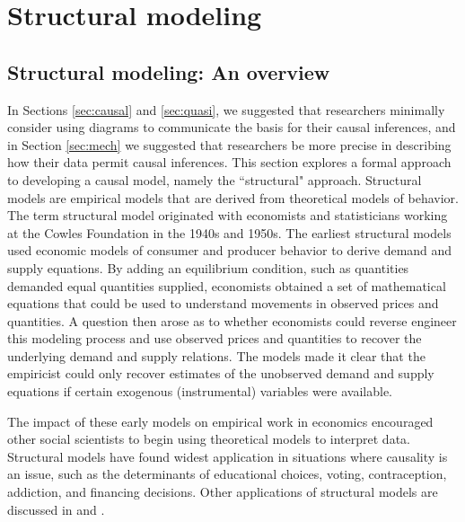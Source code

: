 \section{Structural modeling} \label{sec:struct}

\subsection{Structural modeling: An overview}

In Sections \ref{sec:causal} and \ref{sec:quasi}, we suggested that researchers minimally consider using diagrams to communicate the basis for their causal inferences, and in Section \ref{sec:mech} we suggested that researchers be more precise in describing how their data permit causal
inferences.
This section explores a formal approach to developing a causal model, 
namely the ``structural" approach.
Structural models are empirical models that are derived from theoretical models of behavior.
The term structural model originated with economists and statisticians working at the Cowles Foundation in the 1940s and 1950s.
The earliest structural models used economic models of consumer and producer behavior to derive demand and supply equations.
By adding an equilibrium condition, such as quantities demanded equal quantities supplied, economists obtained a set of mathematical equations that could be used to understand movements in observed prices and quantities. A question then arose as to whether economists could reverse engineer this modeling process and use observed prices and quantities to recover the underlying demand and supply relations.
The models made it clear that the empiricist could only recover estimates of the unobserved demand and supply equations if certain exogenous (instrumental) variables were available. 

The impact of these early models on empirical work in economics encouraged other social scientists to begin using theoretical models to interpret data. 
Structural models have found widest application in situations where causality is an issue, such as the determinants of educational choices, voting, contraception, addiction, and financing decisions. 
Other applications of structural models are discussed in \citet{Reiss:2007ej} and \citet{Reiss:2011go}.

